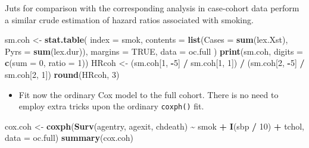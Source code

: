 \documentclass[
]{book}
\newenvironment{Shaded}{\begin{snugshade}}{\end{snugshade}}
\newcommand{\AttributeTok}[1]{\textcolor[rgb]{0.13,0.29,0.53}{#1}}
\newcommand{\ConstantTok}[1]{\textcolor[rgb]{0.56,0.35,0.01}{#1}}
\newcommand{\DecValTok}[1]{\textcolor[rgb]{0.00,0.00,0.81}{#1}}
\newcommand{\FunctionTok}[1]{\textcolor[rgb]{0.13,0.29,0.53}{\textbf{#1}}}
\newcommand{\NormalTok}[1]{#1}
\newcommand{\OtherTok}[1]{\textcolor[rgb]{0.56,0.35,0.01}{#1}}
\newcommand{\SpecialCharTok}[1]{\textcolor[rgb]{0.81,0.36,0.00}{\textbf{#1}}}
\providecommand{\tightlist}{%
  \setlength{\itemsep}{0pt}\setlength{\parskip}{0pt}}
\begin{document}
Juts for comparison with the corresponding analysis in case-cohort data
perform a similar crude estimation of hazard ratios associated with smoking.

\begin{Shaded}
\begin{Highlighting}[]
\NormalTok{sm.coh }\OtherTok{\textless{}{-}} \FunctionTok{stat.table}\NormalTok{(}
  \AttributeTok{index =}\NormalTok{ smok,}
  \AttributeTok{contents =} \FunctionTok{list}\NormalTok{(}\AttributeTok{Cases =} \FunctionTok{sum}\NormalTok{(lex.Xst), }\AttributeTok{Pyrs =} \FunctionTok{sum}\NormalTok{(lex.dur)),}
  \AttributeTok{margins =} \ConstantTok{TRUE}\NormalTok{, }
  \AttributeTok{data =}\NormalTok{ oc.full}
\NormalTok{)}
\FunctionTok{print}\NormalTok{(sm.coh, }\AttributeTok{digits =} \FunctionTok{c}\NormalTok{(}\AttributeTok{sum =} \DecValTok{0}\NormalTok{, }\AttributeTok{ratio =} \DecValTok{1}\NormalTok{))}
\NormalTok{HRcoh }\OtherTok{\textless{}{-}} 
\NormalTok{  (sm.coh[}\DecValTok{1}\NormalTok{, }\SpecialCharTok{{-}}\DecValTok{5}\NormalTok{] }\SpecialCharTok{/}\NormalTok{ sm.coh[}\DecValTok{1}\NormalTok{, }\DecValTok{1}\NormalTok{]) }\SpecialCharTok{/}\NormalTok{ (sm.coh[}\DecValTok{2}\NormalTok{, }\SpecialCharTok{{-}}\DecValTok{5}\NormalTok{] }\SpecialCharTok{/}\NormalTok{ sm.coh[}\DecValTok{2}\NormalTok{, }\DecValTok{1}\NormalTok{])}
\FunctionTok{round}\NormalTok{(HRcoh, }\DecValTok{3}\NormalTok{)}
\end{Highlighting}
\end{Shaded}

\begin{itemize}
\tightlist
\item
  Fit now the ordinary Cox model to the full cohort. There is no need
  to employ extra tricks upon the ordinary \texttt{coxph()} fit.
\end{itemize}

\begin{Shaded}
\begin{Highlighting}[]
\NormalTok{cox.coh }\OtherTok{\textless{}{-}} \FunctionTok{coxph}\NormalTok{(}\FunctionTok{Surv}\NormalTok{(agentry, agexit, chdeath) }\SpecialCharTok{\textasciitilde{}}
\NormalTok{  smok }\SpecialCharTok{+} \FunctionTok{I}\NormalTok{(sbp }\SpecialCharTok{/} \DecValTok{10}\NormalTok{) }\SpecialCharTok{+}\NormalTok{ tchol, }\AttributeTok{data =}\NormalTok{ oc.full)}
\FunctionTok{summary}\NormalTok{(cox.coh)}
\end{Highlighting}
\end{Shaded}
\end{document}
